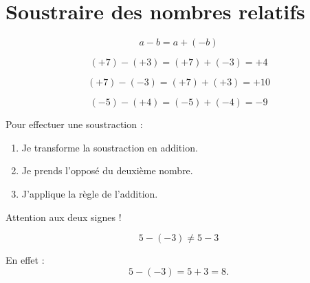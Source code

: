 \section{Soustraire des nombres relatifs}

\begin{propbox}

\[
a-b=a+(-b)
\]
\end{propbox}

\begin{exemplebox}
\[
(+7)-(+3)
= (+7)+(-3)
= +4
\]

\[
(+7)-(-3)
= (+7)+(+3)
= +10
\]

\[
(-5)-(+4)
= (-5)+(-4)
= -9
\]
\end{exemplebox}

\begin{methodebox}
Pour effectuer une soustraction :

\begin{enumerate}
    \item Je transforme la soustraction en addition.
    \item Je prends l'opposé du deuxième nombre.
    \item J'applique la règle de l'addition.
\end{enumerate}
\end{methodebox}

\begin{attentionbox}
Attention aux deux signes !

\[
5-(-3) \neq 5-3
\]

En effet :
\[
5-(-3)=5+3=8.
\]
\end{attentionbox}

